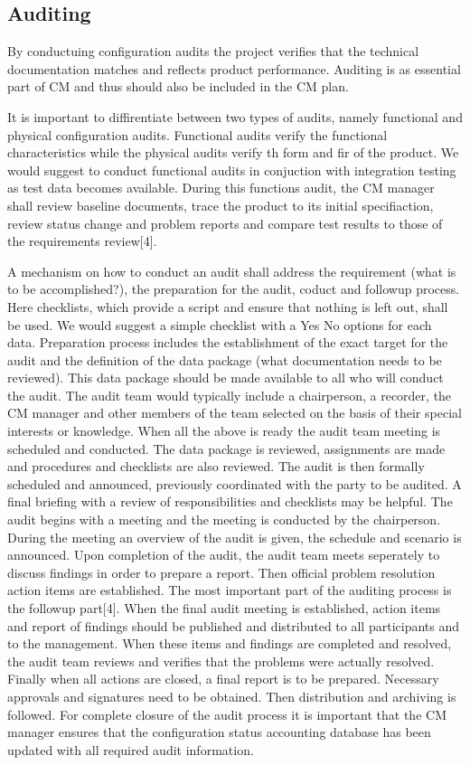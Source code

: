 \documentclass[a4paper]{article}
\begin{document}
\subsection{Auditing}

By conductuing configuration audits the project verifies that the technical documentation matches and reflects product performance. Auditing is as essential part of CM and thus should also be included in the CM plan.

It is important to diffirentiate between two types of audits, namely functional and physical configuration audits. Functional audits verify the functional characteristics while the physical audits verify th form and fir of the product. We would suggest to conduct functional audits in conjuction with integration testing as test data becomes available. During this functions audit, the CM manager shall review baseline documents, trace the product to its initial specifiaction, review status change and problem reports and compare test results to those of the requirements review[4]. 

 A mechanism on how to conduct an audit shall address the requirement (what is to be accomplished?), the preparation for the audit, coduct and followup process. Here checklists, which provide a script and ensure that nothing is left out, shall be used. We would suggest a simple checklist with a Yes No options for each data. Preparation process includes the establishment of the exact target for the audit and the definition of the data package (what documentation needs to be reviewed). This data package should be made available to all who will conduct the audit. The audit team would typically include a chairperson, a recorder, the CM manager and other members of the team selected on the basis of their special interests or knowledge. When all the above is ready the audit team meeting is scheduled and conducted. The data package is reviewed, assignments are made and procedures and checklists are also reviewed. The audit is then formally scheduled and announced, previously coordinated with the party to be audited. A final briefing with a review of responsibilities and checklists may be helpful. The audit begins with a meeting and the meeting is conducted by the chairperson. During the meeting an overview of the audit is given, the schedule and scenario is announced. Upon completion of the audit, the audit team meets seperately to discuss findings in order to prepare a report. Then official problem resolution action items are established. The most important part of the auditing process is the followup part[4]. When the final audit meeting is established, action items and report of findings should be published and distributed to all participants and to the management. When these items and findings are completed and resolved, the audit team reviews and verifies that the problems were actually resolved. Finally when all actions are closed, a final report is to be prepared. Necessary approvals and signatures need to be obtained. Then distribution and archiving is followed. For complete closure of the audit process it is important that the CM manager ensures that the configuration status accounting database has been updated with all required audit information.
\end{document}
